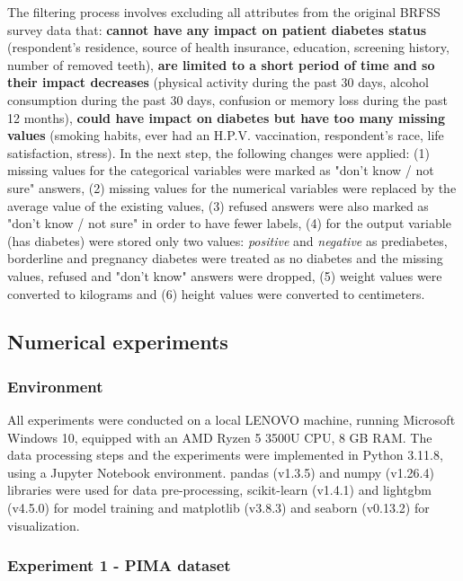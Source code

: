 \documentclass[runningheads]{llncs}
\begin{document}
The filtering process involves excluding all attributes from the original BRFSS survey data that:
\textbf{cannot have any impact on patient diabetes status} (respondent's residence, source of health insurance, education, screening history, number of removed teeth), 
\textbf{are limited to a short period of time and so their impact decreases} (physical activity during the past 30 days, alcohol consumption during the past 30 days, confusion or memory loss during the past 12 months), 
\textbf{could have impact on diabetes but have too many missing values} (smoking habits, ever had an H.P.V. vaccination, respondent's race, life satisfaction, stress). 
In the next step, the following changes were applied: 
(1) missing values for the  categorical variables  were marked as "don't know / not sure" answers, 
(2) missing values for the numerical variables were replaced by the average value of the existing values, 
(3) refused answers were also marked as "don't know / not sure" in order to have fewer labels, 
(4) for the output variable (has diabetes) were stored only two values: \textit{positive} and \textit{negative} as prediabetes, borderline and pregnancy diabetes were treated as no diabetes and the missing values, refused and "don't know" answers were dropped, 
(5) weight values were converted to kilograms and 
(6) height values were converted to centimeters.


\subsection{Numerical experiments}

\subsubsection{Environment}
All experiments were conducted on a local LENOVO machine, running Microsoft Windows 10, equipped with an AMD Ryzen 5 3500U CPU, 8 GB RAM. The data processing steps and the experiments were implemented in Python 3.11.8, using a Jupyter Notebook environment. pandas (v1.3.5) and numpy (v1.26.4) libraries were used for data pre-processing, 
scikit-learn (v1.4.1) and lightgbm (v4.5.0) for model training and
matplotlib (v3.8.3) and seaborn (v0.13.2) for visualization.

\subsubsection{Experiment 1 - PIMA dataset}
\end{document}
